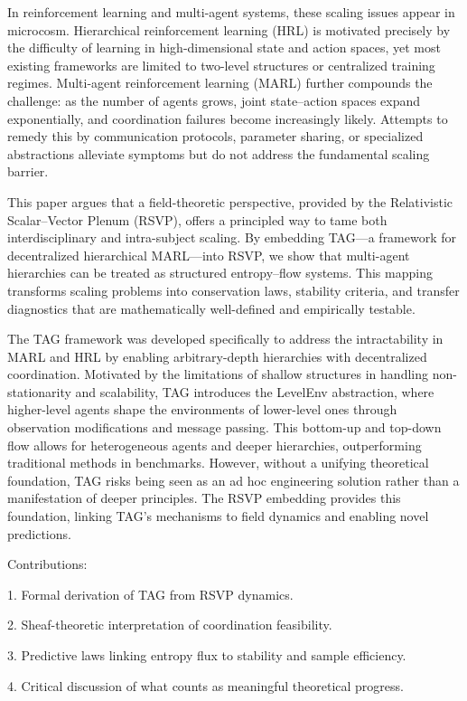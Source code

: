 \documentclass[11pt,a4paper]{article}
\begin{document}
In reinforcement learning and multi-agent systems, these scaling issues
appear in microcosm. Hierarchical reinforcement learning (HRL) is motivated
precisely by the difficulty of learning in high-dimensional state and action
spaces, yet most existing frameworks are limited to two-level structures or
centralized training regimes. Multi-agent reinforcement learning (MARL)
further compounds the challenge: as the number of agents grows, joint
state–action spaces expand exponentially, and coordination failures become
increasingly likely. Attempts to remedy this by communication protocols,
parameter sharing, or specialized abstractions alleviate symptoms but do not
address the fundamental scaling barrier.

This paper argues that a field-theoretic perspective, provided by the
Relativistic Scalar–Vector Plenum (RSVP), offers a principled way to tame
both interdisciplinary and intra-subject scaling. By embedding TAG—a
framework for decentralized hierarchical MARL—into RSVP, we show that
multi-agent hierarchies can be treated as structured entropy–flow systems.
This mapping transforms scaling problems into conservation laws, stability
criteria, and transfer diagnostics that are mathematically well-defined and
empirically testable.

The TAG framework was developed specifically to address the intractability in MARL and HRL by enabling arbitrary-depth hierarchies with decentralized coordination. Motivated by the limitations of shallow structures in handling non-stationarity and scalability, TAG introduces the LevelEnv abstraction, where higher-level agents shape the environments of lower-level ones through observation modifications and message passing. This bottom-up and top-down flow allows for heterogeneous agents and deeper hierarchies, outperforming traditional methods in benchmarks. However, without a unifying theoretical foundation, TAG risks being seen as an ad hoc engineering solution rather than a manifestation of deeper principles. The RSVP embedding provides this foundation, linking TAG's mechanisms to field dynamics and enabling novel predictions.

Contributions:

1. Formal derivation of TAG from RSVP dynamics.

2. Sheaf-theoretic interpretation of coordination feasibility.

3. Predictive laws linking entropy flux to stability and sample efficiency.

4. Critical discussion of what counts as meaningful theoretical progress.
\end{document}
